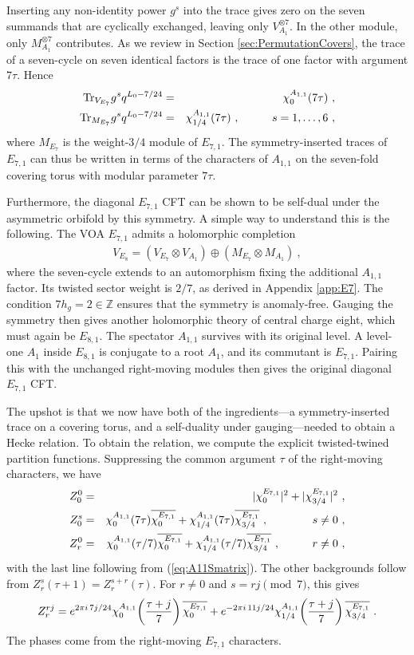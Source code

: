 \documentclass[12pt]{article}
\numberwithin{equation}{section}
\newcommand{\bea}{\begin{eqnarray}}
\newcommand{\eea}{\end{eqnarray}}
\def\no{\nonumber}
\def\ZZ{\mathbb{Z}}
\newcommand{\Tr}{\mathrm{Tr}}
\theoremstyle{remark}
\begin{document}
Inserting any non-identity power $g^s$ into the trace gives zero on the seven summands that are cyclically exchanged, leaving only $V_{A_1}^{\otimes7}$. In the other module, only $M_{A_1}^{\otimes7}$ contributes. As we review in Section \ref{sec:PermutationCovers}, the trace of a seven-cycle on seven identical factors is the trace of one factor with argument $7\tau$. Hence
\bea \label{eq:EsevenTwining}
\Tr_{V_{E_7}}g^s q^{L_0-7/24}&=&\chi^{A_{1,1}}_0(7\tau)~,\no\\
\Tr_{M_{E_7}}g^s q^{L_0-7/24}&=&\chi^{A_{1,1}}_{1/4}(7\tau)~,
\hspace{0.4 in}s=1,\ldots,6~,
\eea
where $M_{E_7}$ is the weight-$3/4$ module of $E_{7,1}$.  The symmetry-inserted traces of $E_{7,1}$ can thus be written in terms of the characters of $A_{1,1}$  on the seven-fold covering torus with modular parameter $7\tau$. 

Furthermore, the diagonal $E_{7,1}$ CFT can be shown to be self-dual under the asymmetric orbifold by this symmetry. A simple way to understand this is the following.  The VOA $E_{7,1}$ admits a holomorphic completion
\bea \label{eq:EsevenSpectatorBranching}
V_{E_8} =(V_{E_7}\otimes V_{A_1})\oplus(M_{E_7}\otimes M_{A_1})~,
\eea
where the seven-cycle extends to an automorphism fixing the additional $A_{1,1}$ factor. Its twisted sector weight is $2/7$, as derived in Appendix \ref{app:E7}. The condition $7h_g=2\in\ZZ$ ensures that the symmetry is anomaly-free. Gauging the symmetry then gives another holomorphic theory of central charge eight, which must again be $E_{8,1}$. The spectator $A_{1,1}$ survives with its original level. A level-one $A_1$ inside $E_{8,1}$ is conjugate to a root $A_1$, and its commutant is $E_{7,1}$. 
Pairing this with the unchanged right-moving modules then gives the original diagonal $E_{7,1}$ CFT. 

The upshot is that we now have both of the ingredients---a symmetry-inserted trace on a covering torus, and a self-duality under gauging---needed to obtain a Hecke relation. To obtain the relation, we compute the explicit twisted-twined partition functions. Suppressing the common argument $\tau$ of the right-moving characters, we have
\bea
Z^0_0&=&|\chi^{E_{7,1}}_0|^2+|\chi^{E_{7,1}}_{3/4}|^2~,
\no\\
Z^s_0&=&\chi^{A_{1,1}}_0(7\tau)\overline{\chi^{E_{7,1}}_0}
+\chi^{A_{1,1}}_{1/4}(7\tau)\overline{\chi^{E_{7,1}}_{3/4}}~, \hspace{0.55 in}s\ne0~,
\no\\
Z^0_r&=&\chi^{A_{1,1}}_0(\tau/7)\overline{\chi^{E_{7,1}}_0}+\chi^{A_{1,1}}_{1/4}(\tau/7)\overline{\chi^{E_{7,1}}_{3/4}}~,
\hspace{0.4 in}r\ne0~,
\eea
with the last line following from (\ref{eq:A11Smatrix}). 
The other backgrounds follow from $Z^s_r(\tau+1)=Z^{s+r}_r(\tau)$. For $r\ne0$ and $s=rj\pmod7$, this gives
\bea \label{eq:EsevenAllTraces}
Z^{rj}_r= e^{2\pi i\,7j/24}\chi^{A_{1,1}}_0\!\left({\tau+j\over 7}\right)
\overline{\chi^{E_{7,1}}_0} +e^{-2\pi i\,11j/24}\chi^{A_{1,1}}_{1/4}\!\left({\tau+j\over 7}\right)
\overline{\chi^{E_{7,1}}_{3/4}}~.
\eea
The phases come from the right-moving $E_{7,1}$ characters. 
\end{document}

